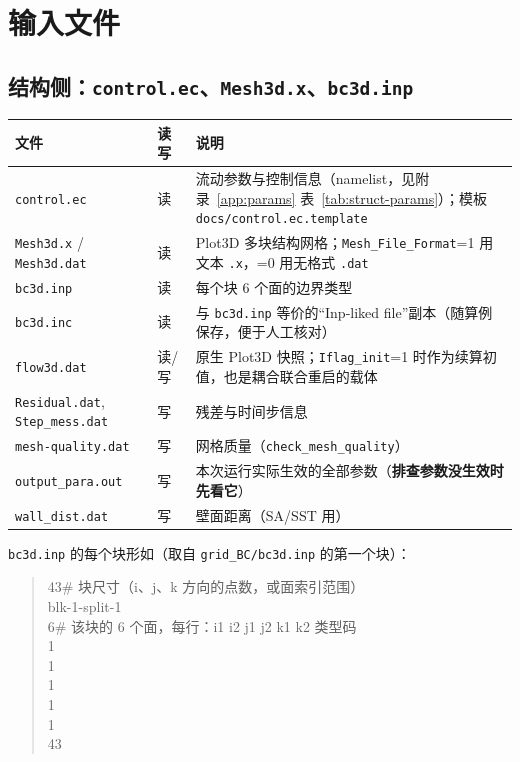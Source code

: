 \documentclass[11pt,a4paper]{ctexart}
\begin{document}
\section{输入文件}\label{sec:inputs}

\subsection{结构侧：\texttt{control.ec}、\texttt{Mesh3d.x}、\texttt{bc3d.inp}}

\begin{center}\small
\begin{tabular}{@{}>{\raggedright\arraybackslash}p{}>{\raggedright\arraybackslash}p{}>{\raggedright\arraybackslash}p{}@{}}
\toprule
文件 & 读写 & 说明 \\
\midrule
\texttt{control.ec} & 读 & 流动参数与控制信息（namelist，见附录~\ref{app:params} 表~\ref{tab:struct-params}）；模板 \texttt{docs/control.ec.template} \\
\texttt{Mesh3d.x} / \texttt{Mesh3d.dat} & 读 & Plot3D 多块结构网格；\texttt{Mesh\_File\_Format}=1 用文本 \texttt{.x}，=0 用无格式 \texttt{.dat} \\
\texttt{bc3d.inp} & 读 & 每个块 6 个面的边界类型 \\
\texttt{bc3d.inc} & 读 & 与 \texttt{bc3d.inp} 等价的``Inp-liked file''副本（随算例保存，便于人工核对） \\
\texttt{flow3d.dat} & 读/写 & 原生 Plot3D 快照；\texttt{Iflag\_init}=1 时作为续算初值，也是耦合联合重启的载体 \\
\texttt{Residual.dat}, \texttt{Step\_mess.dat} & 写 & 残差与时间步信息 \\
\texttt{mesh-quality.dat} & 写 & 网格质量（\texttt{check\_mesh\_quality}） \\
\texttt{output\_para.out} & 写 & 本次运行实际生效的全部参数（\textbf{排查参数没生效时先看它}） \\
\texttt{wall\_dist.dat} & 写 & 壁面距离（SA/SST 用） \\
\bottomrule
\end{tabular}
\end{center}

\texttt{bc3d.inp} 的每个块形如（取自 \texttt{grid\_BC/bc3d.inp} 的第一个块）：

\begin{quote}\ttfamily\small
43\phantom{xxxx}\# 块尺寸（i、j、k 方向的点数，或面索引范围）\\
blk-1-split-1 \\
6\phantom{xxxxxxxxx}\# 该块的 6 个面，每行：i1 i2 j1 j2 k1 k2 类型码 \\
1 \\
1 \\
1 \\
1 \\
1 \\
43
\end{quote}
\end{document}
